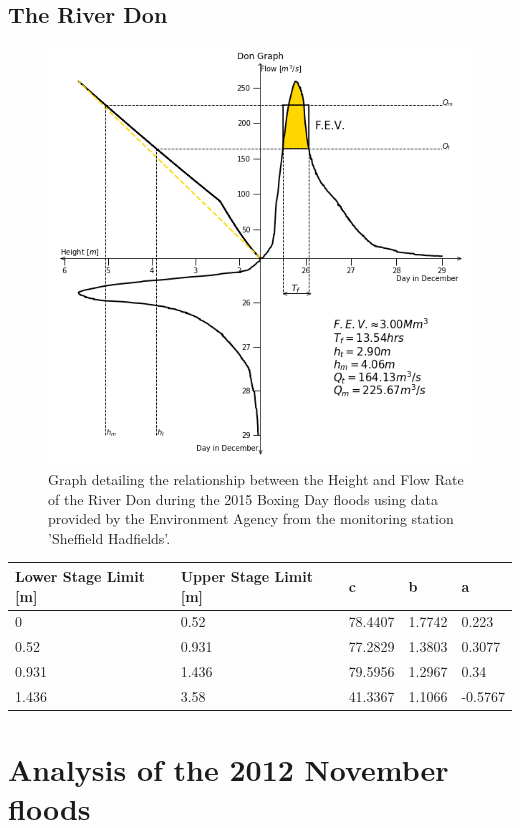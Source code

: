 \documentclass[11 pt, a4paper]{article}
\begin{document}
\subsection{The River Don}
\begin{figure}[H]
\begin{center}
\includegraphics[width=.5\linewidth]{Don-Quadrant_Graph.png}
\caption{Graph detailing the relationship between the Height and Flow Rate of the River Don during the 2015 Boxing Day floods using data provided by the Environment Agency from the monitoring station 'Sheffield Hadfields'.}
\end{center}
\end{figure}
\begin{center}
\begin{tabular}{|l|l|l|l|l|}
\hline
Lower Stage Limit {[}m{]} & Upper Stage Limit {[}m{]} & c & b & a \\
\hline
0 & 0.52 & 78.4407 & 1.7742 & 0.223 \\
0.52 & 0.931 & 77.2829 & 1.3803 & 0.3077 \\
0.931 & 1.436 & 79.5956 & 1.2967 & 0.34 \\
1.436 & 3.58 & 41.3367 & 1.1066 & -0.5767 \\
\hline
\end{tabular}
\end{center}

\newpage
\section{Analysis of the 2012 November floods}
\end{document}
